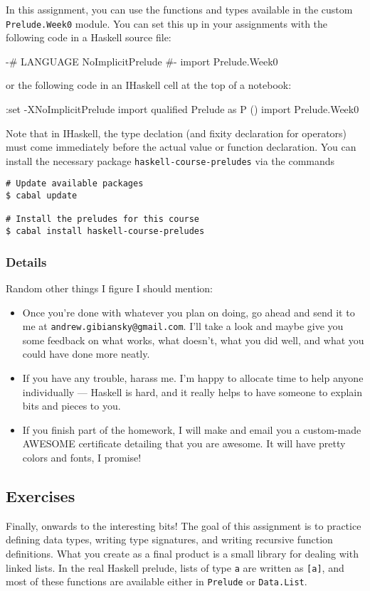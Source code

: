 \documentclass{article}
\begin{document}
In this assignment, you can use the functions and types available in the custom
\texttt{Prelude.Week0} module. You can set this up in your assignments with the following code in a
Haskell source file:
\begin{haskellcode}
{-# LANGUAGE NoImplicitPrelude #-}
import Prelude.Week0
\end{haskellcode}
or the following code in an IHaskell cell at the top of a notebook:
\begin{haskellcode}
:set -XNoImplicitPrelude
import qualified Prelude as P ()
import Prelude.Week0
\end{haskellcode}
Note that in IHaskell, the type declation (and fixity declaration for operators) must come
immediately before the actual value or function declaration.
You can install the necessary package \texttt{haskell-course-preludes} via the commands
\begin{verbatim}
# Update available packages
$ cabal update

# Install the preludes for this course
$ cabal install haskell-course-preludes
\end{verbatim}

\subsubsection*{Details}

Random other things I figure I should mention:
\begin{itemize}
    \item Once you're done with whatever you plan on doing, go ahead and send it to me at
        \texttt{andrew.gibiansky@gmail.com}. I'll take a look and maybe give you some feedback on
        what works, what doesn't, what you did well, and what you could have done more neatly.
    \item If you have any trouble, harass me. I'm happy to allocate time to help anyone individually
        --- Haskell is hard, and it really helps to have someone to explain bits and pieces to you.
    \item If you finish part of the homework, I will make and email you a custom-made AWESOME
        certificate detailing that you are awesome. It will have pretty colors and fonts, I promise!
\end{itemize}

\subsection*{Exercises}
Finally, onwards to the interesting bits! The goal of this assignment is to practice defining data
types, writing type signatures, and writing recursive function definitions. What you create as a
final product is a small library for dealing with linked lists. In the real Haskell prelude, lists
of type \texttt{a} are written as \texttt{[a]}, and most of these functions are available either in
\texttt{Prelude} or \texttt{Data.List}.
\end{document}
